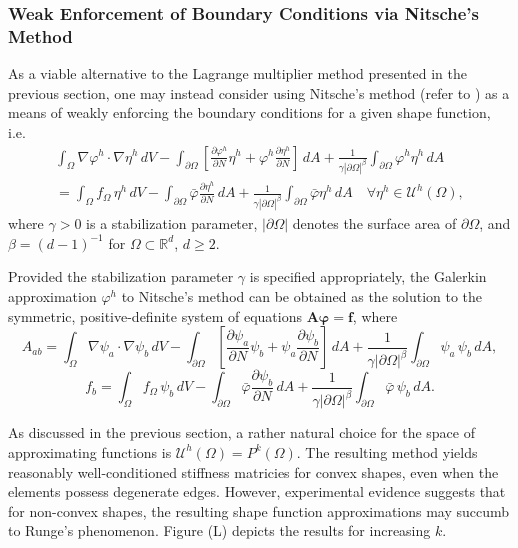 	\subsubsection*{Weak Enforcement of Boundary Conditions via Nitsche's Method}
	
	As a viable alternative to the Lagrange multiplier method presented in the previous section, one may instead consider using Nitsche's method (refer to \cite{Juntunen&Stenberg:09}) as a means of weakly enforcing the boundary conditions for a given shape function, i.e.
	\begin{eqnarray}
		\int_{\Omega} \nabla \varphi^h \cdot \nabla \eta^h \, dV - \int_{\partial \Omega} \left[ \frac{\partial \varphi^h}{\partial N} \eta^h + \varphi^h \frac{\partial \eta^h}{\partial N} \right] \, dA + \frac{1}{\gamma |\partial \Omega|^{\beta}} \int_{\partial \Omega} \varphi^h \eta^h \, dA \nonumber \\ = \int_\Omega f_\Omega \, \eta^h \, dV - \int_{\partial \Omega} \bar{\varphi} \frac{\partial \eta^h}{\partial N} \, dA + \frac{1}{\gamma |\partial \Omega|^{\beta}} \int_{\partial \Omega} \bar{\varphi} \eta^h \, dA \quad \forall \eta^h \in \mathcal{U}^h (\Omega),
	\end{eqnarray}
	where $\gamma > 0$ is a stabilization parameter, $| \partial \Omega |$ denotes the surface area of $\partial \Omega$, and $\beta = (d-1)^{-1}$ for $\Omega \subset \mathbb{R}^d$, $d \geq 2$.
	
	Provided the stabilization parameter $\gamma$ is specified appropriately, the Galerkin approximation $\varphi^h$ to Nitsche's method can be obtained as the solution to the symmetric, positive-definite system of equations $\mathbf{A} \boldsymbol{\varphi} = \mathbf{f}$, where
	\begin{equation}
		A_{ab} = \int_{\Omega} \nabla \psi_a \cdot \nabla \psi_b \, dV - \int_{\partial \Omega} \left[ \frac{\partial \psi_a}{\partial N} \psi_b + \psi_a \frac{\partial \psi_b}{\partial N} \right] \, dA + \frac{1}{\gamma |\partial \Omega|^{\beta}} \int_{\partial \Omega} \psi_a \, \psi_b \, dA,
	\end{equation}
	\begin{equation}
		f_{b} = \int_{\Omega} f_\Omega \, \psi_b \, dV - \int_{\partial \Omega} \bar{\varphi} \frac{\partial \psi_b}{\partial N} \, dA + \frac{1}{\gamma |\partial \Omega|^{\beta}} \int_{\partial \Omega} \bar{\varphi} \, \psi_b \, dA.
	\end{equation}
	
	As discussed in the previous section, a rather natural choice for the space of approximating functions is $\mathcal{U}^h (\Omega) = P^{k} (\Omega)$. The resulting method yields reasonably well-conditioned stiffness matricies for convex shapes, even when the elements possess degenerate edges. However, experimental evidence suggests that for non-convex shapes, the resulting shape function approximations may succumb to Runge's phenomenon. Figure (L) depicts the results for increasing $k$.
	
